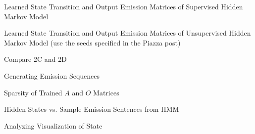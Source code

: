 \noindent\problem[10] %
Learned State Transition and Output Emission Matrices of Supervised Hidden Markov Model
\begin{subsolution}
	
\end{subsolution}
\clearpage

\indent\problem[15] %
Learned State Transition and Output Emission Matrices of Unsupervised Hidden Markov Model (use the seeds specified in the Piazza post)
\begin{subsolution}
	
\end{subsolution}
\clearpage

\problem[5] Compare 2C and 2D
\begin{subsolution}
	
\end{subsolution}
\clearpage

\problem[5] Generating Emission Sequences
\begin{subsolution}
	
\end{subsolution}
\clearpage

\indent\problem[3] %
Sparsity of Trained $A$ and $O$ Matrices
\begin{subsolution}
	
\end{subsolution}
\clearpage

\indent\problem[5] %
Hidden States vs. Sample Emission Sentences from HMM

\begin{subsolution}
	
\end{subsolution}
\clearpage


\indent\problem[5] %
Analyzing Visualization of State
\begin{subsolution}
	
\end{subsolution}
\clearpage



